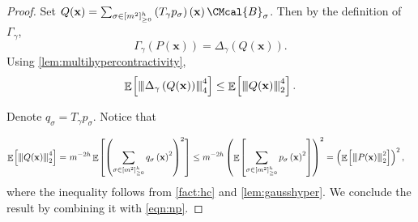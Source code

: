 \documentclass[10pt,a4paper]{article}
\def\B{\CMcal{B}}
\theoremstyle{plain}
\theoremstyle{definition}
\newcommand {\minusspace} {\: \! \!}
\newcommand {\Fn} [2] {\ensuremath{ #1 \minusspace \Br{ #2 } }}
\newcommand {\br} [1] {\ensuremath{ \left( #1 \right) }}
\newcommand {\Br} [1] {\ensuremath{ \left[ #1 \right] }}
\DeclareMathOperator*{\bigE}{\mathbb{E}}
\newcommand {\expec} [2] {\Fn{\bigE_{\substack{#1}}}{#2}}
\newcommand{\nnorm}[1]{{\left\vert\kern-0.25ex\left\vert\kern-0.25ex\left\vert #1
		\right\vert\kern-0.25ex\right\vert\kern-0.25ex\right\vert}}
\newcommand{\randx}{\ensuremath{\mathbf{x}}}
\newcommand{\1}{\mathbb{1}} %
\begin{document}
	\begin{proof}

		Set $ Q(\randx)=\sum_{\sigma\in[m^2]_{\geq0}^h}\br{T_\gamma p_\sigma}\br{\randx}\B_\sigma$. Then by the definition of $\Gamma_{\gamma}$,
		\[\Gamma_{\gamma}\br{P(\randx)}=\Delta_{\gamma}\br{Q(\randx)}.\]
		\noindent Using \cref{lem:multihypercontractivity},
		\begin{equation}\label{eqn:np}
\expec{}{\nnorm{\Delta_{\gamma}\br{Q(\randx)}}_4^4}\leq\expec{}{\nnorm{Q(\randx)}_2^4}.
		\end{equation}


		Denote $q_\sigma=T_\gamma p_\sigma$. Notice that

\begin{align*}
\expec{}{\nnorm{Q(\randx)}_2^4}
=~&m^{-2h}\expec{}{\br{\sum_{\sigma\in[m^2]_{\geq0}^h}q_{\sigma}\br{\randx}^2}^2}\leq m^{-2h}\br{\expec{}{\sum_{\sigma\in[m^2]_{\geq0}^h}p_{\sigma}\br{\randx}^2}}^2
=\br{\expec{}{\nnorm{P(\randx)}_2^2}}^2,
		\end{align*}
		where the inequality follows from \cref{fact:hc} and \cref{lem:gausshyper}. We conclude the result by combining it with \cref{eqn:np}.
		
	\end{proof}
	
\end{document}

